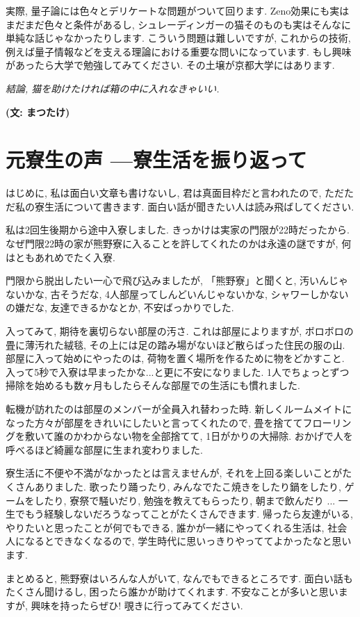 \documentclass[10pt,b5jsbook,dvips,dvipdfmx,openany]{jsbook}
\theoremstyle{definition}
\begin{document}
    実際, 量子論には色々とデリケートな問題がついて回ります. Zeno効果にも実はまだまだ色々と条件があるし, シュレーディンガーの猫そのものも実はそんなに単純な話じゃなかったりします. こういう問題は難しいですが, これからの技術, 例えば量子情報などを支える理論における重要な問いになっています. もし興味があったら大学で勉強してみてください. その土壌が京都大学にはあります.

    \emph{結論, 猫を助けたければ箱の中に入れなきゃいい.}

		{\bf (文: まつたけ)}

	\section{元寮生の声 ---寮生活を振り返って}
	 はじめに, 私は面白い文章も書けないし, 君は真面目枠だと言われたので, ただただ私の寮生活について書きます. 面白い話が聞きたい人は読み飛ばしてください.

 	私は2回生後期から途中入寮しました. きっかけは実家の門限が22時だったから. なぜ門限22時の家が熊野寮に入ることを許してくれたのかは永遠の謎ですが, 何はともあれめでたく入寮.

	 門限から脱出したい一心で飛び込みましたが, 「熊野寮」と聞くと, 汚いんじゃないかな, 古そうだな, 4人部屋ってしんどいんじゃないかな, シャワーしかないの嫌だな, 友達できるかなとか, 不安ばっかりでした.

 	入ってみて, 期待を裏切らない部屋の汚さ. これは部屋によりますが, ボロボロの畳に薄汚れた絨毯, その上には足の踏み場がないほど散らばった住民の服の山. 部屋に入って始めにやったのは, 荷物を置く場所を作るために物をどかすこと. 入って5秒で入寮は早まったかな...と更に不安になりました. 1人でちょっとずつ掃除を始めるも数ヶ月もしたらそんな部屋での生活にも慣れました.

 	転機が訪れたのは部屋のメンバーが全員入れ替わった時. 新しくルームメイトになった方々が部屋をきれいにしたいと言ってくれたので, 畳を捨ててフローリングを敷いて誰のかわからない物を全部捨てて, 1日がかりの大掃除. おかげで人を呼べるほど綺麗な部屋に生まれ変わりました.

 	寮生活に不便や不満がなかったとは言えませんが, それを上回る楽しいことがたくさんありました. 歌ったり踊ったり, みんなでたこ焼きをしたり鍋をしたり, ゲームをしたり, 寮祭で騒いだり, 勉強を教えてもらったり, 朝まで飲んだり ... 一生でもう経験しないだろうなってことがたくさんできます. 帰ったら友達がいる, やりたいと思ったことが何でもできる, 誰かが一緒にやってくれる生活は, 社会人になるとできなくなるので, 学生時代に思いっきりやっててよかったなと思います.

	まとめると, 熊野寮はいろんな人がいて, なんでもできるところです. 面白い話もたくさん聞けるし, 困ったら誰かが助けてくれます. 不安なことが多いと思いますが, 興味を持ったらぜひ! 覗きに行ってみてください.
\end{document}
